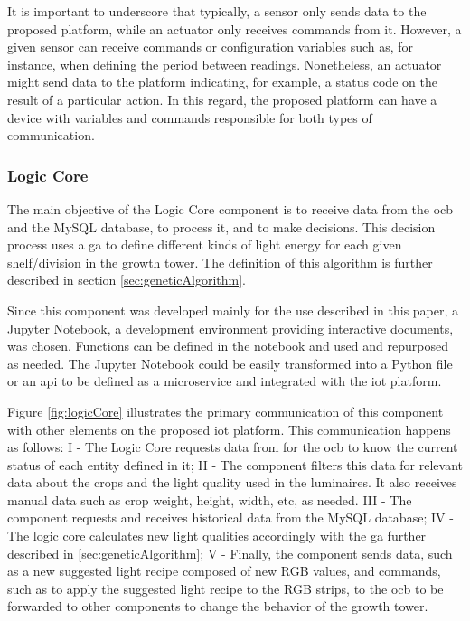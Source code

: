 \documentclass[preprint, review, 12pt]{elsarticle}
\begin{document}
It is important to underscore that typically, a sensor only sends data to the proposed platform, while an actuator only receives commands from it. However, a given sensor can receive commands or configuration variables such as, for instance, when defining the period between readings. Nonetheless, an actuator might send data to the platform indicating, for example, a status code on the result of a particular action. In this regard, the proposed platform can have a device with variables and commands responsible for both types of communication.  

\subsubsection{Logic Core}
\label{sec:logicCore}

The main objective of the Logic Core component is to receive data from the \gls{ocb} and the MySQL database, to process it, and to make decisions. This decision process uses a \gls{ga} to define different kinds of light energy for each given shelf/division in the growth tower. The definition of this algorithm is further described in section \ref{sec:geneticAlgorithm}. 

Since this component was developed mainly for the use described in this paper, a Jupyter Notebook, a development environment providing interactive documents, was chosen. Functions can be defined in the notebook and used and repurposed as needed. The Jupyter Notebook could be easily transformed into a Python file or an \gls{api} to be defined as a microservice and integrated with the \gls{iot} platform. 

Figure \ref{fig:logicCore} illustrates the primary communication of this component with other elements on the proposed \gls{iot} platform. This communication happens as follows: I - The Logic Core requests data from for the \gls{ocb} to know the current status of each entity defined in it; II - The component filters this data for relevant data about the crops and the light quality used in the luminaires. It also receives manual data such as crop weight, height, width, etc, as needed. III - The component requests and receives historical data from the MySQL database; IV - The logic core calculates new light qualities accordingly with the \gls{ga} further described in \ref{sec:geneticAlgorithm}; V - Finally, the component sends data, such as a new suggested light recipe composed of new RGB values, and commands, such as to apply the suggested light recipe to the RGB strips, to the \gls{ocb} to be forwarded to other components to change the behavior of the growth tower. 
\end{document}
